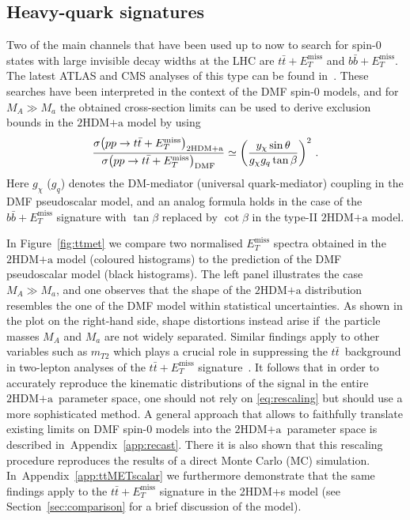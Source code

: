\documentclass[a4paper, 11pt,notoc]{article}
\newcommand{\MET}{\ensuremath{E_T^\mathrm{miss}}\xspace}
\newcommand{\hdma}{\ensuremath{\textrm{2HDM+a}}\xspace}
\begin{document}
\subsection*{Heavy-quark signatures}

Two of the main channels that have been used up to now  to search for spin-0 states with large invisible decay widths at the LHC are $t \bar t + \MET$ and $b \bar b + \MET$. The latest ATLAS and CMS analyses of this type can be found in~\cite{Aaboud:2017rzf,CMS-PAS-EXO-16-049}. These searches have been interpreted in the context of the DMF spin-0   models, and for $M_A \gg M_a$ the obtained cross-section limits can be used  to derive exclusion bounds in the \hdma model by using~\cite{Bauer:2017ota}
\begin{equation} \label{eq:rescaling}
\frac{\sigma \! \left ( pp \to t \bar t + \MET\right )_{\hdma}}{\sigma \! \left ( pp \to t \bar t + \MET\right )_{\rm DMF}} \simeq \left ( \frac{y_\chi \sin \theta}{g_\chi g_q \tan \beta} \right )^2 \, .
\end{equation}
Here $g_\chi$ ($g_q$) denotes the DM-mediator (universal quark-mediator) coupling in the DMF  pseudoscalar  model, and an analog formula holds in the case of the $b \bar b + \MET$ signature with $\tan \beta$ replaced by $\cot \beta$ in the type-II \hdma model. 

In Figure~\ref{fig:ttmet} we compare two normalised $\MET$ spectra obtained in the \hdma model (coloured histograms) to the prediction of the DMF pseudoscalar   model (black histograms).  The left panel illustrates the case~$M_A \gg M_a$, and one observes that the shape of the \hdma distribution resembles  the one of the DMF model within statistical uncertainties. As shown in the plot on the right-hand side, shape distortions instead arise if~the particle masses $M_A$ and $M_a$ are not widely separated.  Similar findings apply to other variables such as $m_{T2}$ which  plays a crucial role in suppressing the $t \bar t$~background in two-lepton analyses of the $t \bar t + \MET$ signature~\cite{Aaboud:2017rzf,Haisch:2016gry}. It follows that in order to accurately reproduce the kinematic distributions of the signal in the entire \hdma~parameter space, one should not rely on \eqref{eq:rescaling} but should use a more sophisticated method. A general approach  that allows to faithfully translate existing limits on DMF spin-0   models into the \hdma~parameter space  is described in~Appendix~\ref{app:recast}. There it is also shown that this rescaling procedure reproduces the results of a direct Monte Carlo (MC) simulation.  In~Appendix~\ref{app:ttMETscalar} we furthermore demonstrate that the same findings apply to the $t \bar t + \MET$ signature in the 2HDM+s model  (see Section~\ref{sec:comparison} for a brief discussion of the model).
\end{document}
